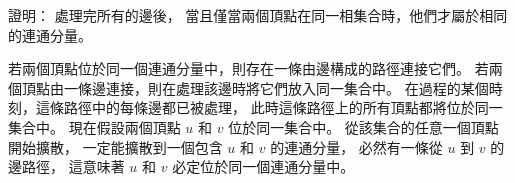 \startEXERCISE
證明：  處理完所有的邊後，
當且僅當兩個頂點在同一相集合時，他們才屬於相同的連通分量。
\stopEXERCISE

\startANSWER
若兩個頂點位於同一個連通分量中，則存在一條由邊構成的路徑連接它們。
若兩個頂點由一條邊連接，則在處理該邊時將它們放入同一集合中。
在過程的某個時刻，這條路徑中的每條邊都已被處理，
此時這條路徑上的所有頂點都將位於同一集合中。
現在假設兩個頂點 $u$ 和 $v$ 位於同一集合中。
從該集合的任意一個頂點開始擴散，
一定能擴散到一個包含 $u$ 和 $v$ 的連通分量，
必然有一條從 $u$ 到 $v$ 的邊路徑，
這意味著 $u$ 和 $v$ 必定位於同一個連通分量中。
\stopANSWER
